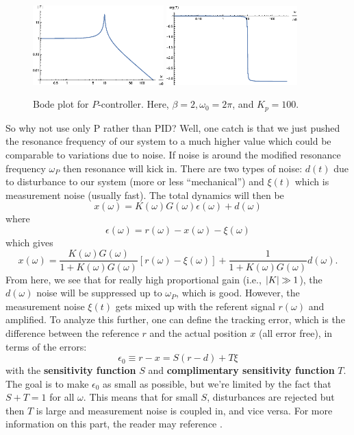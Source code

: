 \documentclass{article}
\theoremstyle{definition}
\newcommand{\f}[2]{\frac{#1}{#2}}
\begin{document}
\begin{figure}[!htb]
	\centering
	\includegraphics[width=0.45\textwidth]{bode_5}
	\quad
	\includegraphics[width=0.45\textwidth]{bode_6}
	\caption{Bode plot for $P$-controller. Here, $\beta = 2,\omega_0 = 2\pi$, and $K_p = 100$.} %
	\label{fig:bode_3}
\end{figure}



So why not use only P rather than PID? Well, one catch is that we just pushed the resonance frequency of our system to a much higher value which could be comparable to variations due to noise. If noise is around the modified resonance frequency $\omega_P$ then resonance will kick in. There are two types of noise: $d(t)$ due to disturbance to our system (more or less ``mechanical'') and $\xi(t)$ which is measurement noise (usually fast). The total dynamics will then be 
\begin{equation*}
x(\omega) = K(\omega)G(\omega) \epsilon(\omega) + d(\omega)
\end{equation*}
where 
\begin{equation*}
\epsilon(\omega) = r(\omega) - x(\omega) - \xi(\omega)
\end{equation*}
which gives
\begin{equation*}
x(\omega) = \f{K(\omega)G(\omega)}{1+K(\omega)G(\omega)}[r(\omega)-\xi(\omega)] + \f{1}{1+K(\omega)G(\omega)}d(\omega).
\end{equation*}
From here, we see that for really high proportional gain (i.e., $\abs{K} \gg 1$), the $d(\omega)$ noise will be suppressed up to $\omega_P$, which is good. However, the measurement noise $\xi(t)$ gets mixed up with the referent signal $r(\omega)$ and amplified. To analyze this further, one can define the tracking error, which is the difference between the reference $r$ and the actual position $x$ (all error free), in terms of the errors:
\begin{equation*}
\epsilon_0 \equiv r - x = S(r-d) + T\xi
\end{equation*}
with the \textbf{sensitivity function} $S$ and \textbf{complimentary sensitivity function} $T$. The goal is to make $\epsilon_0$ as small as possible, but we're limited by the fact that $S+T=1$ for all $\omega$. This means that for small $S$, disturbances are rejected but then $T$ is large and measurement noise is coupled in, and vice versa.
For more information on this part, the reader may reference \cite{bechhoefer2005feedback}.
\end{document}
